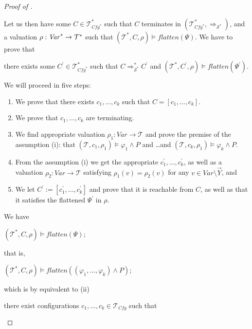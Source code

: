 \begin{proof}[Proof of ]
\begin{enumerate}
    Let us then have some $C \in \mathcal{T}^*_{\mathit{Cfg}^*}$
    such that $C$ terminates in $(\mathcal{T}^*_{\mathit{Cfg}^*}, \Rightarrow_{\mathcal{S}^*})$,
    and a valuation $\rho : \mathit{Var}^* \to \mathcal{T}^*$
    such that $(\mathcal{T}^*, C, \rho) \vDash \mathit{flatten}(\Psi)$.
    We have to prove that
    \begin{proofenv}
    there exists some $C^\prime \in \mathcal{T}^*_{\mathit{Cfg}^*}$
    such that
    $C \Rightarrow^{*}_{\mathcal{S}^*} C^\prime$
    and $(\mathcal{T}^*, C^\prime, \rho) \vDash \mathit{flatten}(\Psi^\prime)$.
    \end{proofenv}
    We will proceed in five steps:
    \begin{enumerate}
        \item \label{item:corr:step1} We prove that there exists $c_1,\ldots,c_k$ such that $C = [c_1,\ldots, c_k]$.
        \item \label{item:corr:step2} We prove that $c_1,\ldots,c_k$ are terminating.
        \item \label{item:corr:step3} We find appropriate valuation $\rho_1 : \mathit{Var} \to \mathcal{T}$
              and prove the premise of the assumption (i): that $(\mathcal{T}, c_1, \rho_1) \vDash \varphi_1 \land P$
        and \ldots and $(\mathcal{T}, c_k, \rho_1) \vDash \varphi_k \land P$.
        \item \label{item:corr:step4} From the assumption (i) we get the appropriate $c_1^\prime,\ldots,c_k^\prime$,
        as well as a valuation $\rho_2 : \mathit{Var} \to \mathcal{T}$ satisfying $\rho_1(v) = \rho_2(v)$ for any $v \in \mathit{Var} \setminus \vec{Y}$, and 
        \item \label{item:corr:step5} We let $C^\prime := [c_1^\prime,\ldots,c_k^\prime]$ and prove that it is reachable from $C$,
        as well as that it satisfies the flattened $\Psi^\prime$ in $\rho$.
    \end{enumerate}
    We have
    \begin{proofenv}
    $(\mathcal{T}^*, C, \rho) \vDash \mathit{flatten}(\Psi)$;
    \end{proofenv}
    that is,
    \begin{proofenv}
    $(\mathcal{T}^*, C, \rho) \vDash \mathit{flatten}((\varphi_1, \ldots, \varphi_k) \land P)$;
    \end{proofenv}
    which is by  equivalent to (ii)
    \begin{proofenv}
        there exist configurations $c_1, \ldots, c_k \in \mathcal{T}_{\mathit{Cfg}}$ such that

\end{proofenv}
\end{enumerate}
\end{proof}

